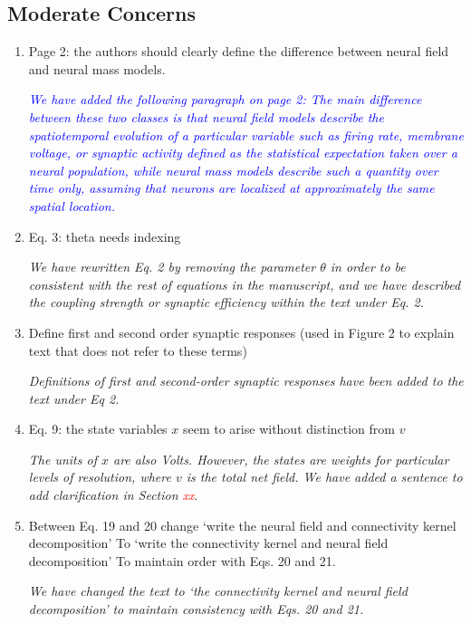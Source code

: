\documentclass{article}
\newcommand{\dean}[1]{\textcolor{red}{#1}}
\newcommand{\parham}[1]{\textcolor{blue}{#1}}
\begin{document}
			\subsection{Moderate Concerns} 
			\begin{enumerate} 
			 \item Page 2: the authors should clearly define the difference between neural field and neural mass models.
			
			\emph{\parham{We have added the following paragraph on page 2: The main difference between these two classes is that neural field models describe the spatiotemporal evolution of a particular variable such as firing rate, membrane voltage, or synaptic activity defined as the statistical expectation taken over a neural population, while neural mass models describe such a quantity over time only, assuming that neurons are localized at approximately the same spatial location.}}
			
			\item Eq. 3: theta needs indexing 
 
			\emph{We have rewritten Eq. 2 by removing the parameter $\theta$ in order to be consistent with the rest of equations in the manuscript, and we have described the coupling strength or synaptic efficiency within the text under Eq. 2.}
 			
			\item Define first and second order synaptic responses (used in Figure 2 to explain text that does not refer to these terms)
			
			\emph{Definitions of first and second-order synaptic responses have been added to the text under Eq 2.}
			
			\item{Eq. 9: the state variables $x$ seem to arise without distinction from $v$}  
			
			\emph{The units of $x$ are also Volts. However, the states are weights for particular levels of resolution, where $v$ is the total net field. We have added a sentence to add clarification in Section \dean{xx}}.
			
			\item Between Eq. 19 and 20 change
			`write the neural field and connectivity kernel decomposition' To `write the connectivity kernel and neural field decomposition'
			To maintain order with Eqs. 20 and 21.

			\emph{We have changed the text to `the connectivity kernel and neural field decomposition' to maintain consistency with Eqs. 20 and 21.}
			
			 
			 \end{enumerate}  
\end{document}
